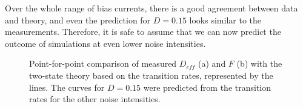 \documentclass[12pt,a4paper]{article}
\begin{document}
Over the whole range of bias currents, there is a good agreement between data and theory, and even the prediction for $D=0.15$ looks similar to the measurements. Therefore, it is safe to assume that we can now predict the outcome of simulations at even lower noise intensities. 
\begin{figure}[H]
	\hspace*{-0.5cm}
	\caption{Point-for-point comparison of measured $D_{eff}$ (a) and $F$ (b) with the two-state theory based on the transition rates, represented by the lines. The curves for $D=0.15$ were predicted from the transition rates for the other noise intensities.}
\end{figure}
\end{document}
